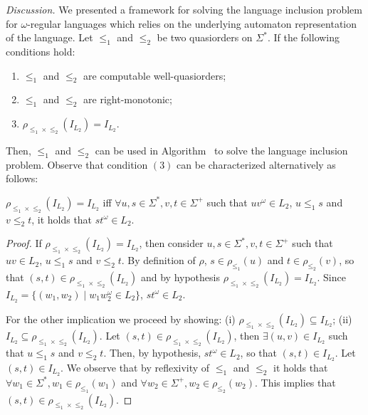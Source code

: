 \emph{Discussion.}
We presented a framework for solving the language inclusion problem for
$\omega$-regular languages which relies on the underlying automaton representation
of the language.
Let $\leq_1$ and $\leq_2$ be two quasiorders on $\Sigma^*$.
If the following conditions hold:
\begin{enumerate}
\item $\leq_1$ and $\leq_2$ are computable well-quasiorders;
\item $\leq_1$ and $\leq_2$ are right-monotonic;
\item $\rho_{\leq_1 \times \leq_2}(I_{L_2}) = I_{L_2}$.
\end{enumerate}
Then, $\leq_1$ and $\leq_2$ can be used in Algorithm~
to solve the language inclusion problem.
Observe that condition $(3)$ can be characterized alternatively as follows:

\begin{proposition}
\label{prop:rho-iff-stomega-in-lang}
$\rho_{\leq_1 \times \leq_2}(I_{L_2}) = I_{L_2}$ iff
$\forall u,s \in \Sigma^*, v,t \in \Sigma^+$
such that $uv ^{\omega} \in L_2$, $u \leq_1 s$ and $v \leq_2 t$,
it holds that $st ^{\omega} \in L_2$.
\end{proposition}

\begin{proof}
If $\rho_{\leq_1 \times \leq_2}(I_{L_2}) = I_{L_2}$, then
consider $u,s \in \Sigma^*, v,t \in \Sigma^+$ such that
$uv \in L_2$, $u \leq_1 s$ and $v \leq_2 t$.
By definition of $\rho$, $s \in \rho_{\leq_1}(u)$ and $t \in \rho_{\leq_2}(v)$,
so that $(s,t) \in \rho_{\leq_1 \times \leq_2}(I_{L_2})$ and by hypothesis
$\rho_{\leq_1 \times \leq_2}(I_{L_2}) = I_{L_2}$.
Since $I_{L_2} = \{ (w_1,w_2) \;|\; w_1w_2^{\omega} \in L_2\}$,
$st ^{\omega} \in L_2$.

For the other implication we proceed by showing:
(i) $\rho_{\leq_1 \times \leq_2}(I_{L_2}) \subseteq I_{L_2}$;
(ii) $ I_{L_2} \subseteq \rho_{\leq_1 \times \leq_2}(I_{L_2})$.
Let $(s,t) \in \rho_{\leq_1 \times \leq_2}(I_{L_2})$, then
$\exists (u,v) \in I_{L_2}$ such that $u \leq_1 s$ and $v \leq_2 t$.
Then, by hypothesis, $st ^{\omega} \in L_2$, so that $(s,t) \in I_{L_2}$.
Let $(s,t) \in I_{L_2}$.
We observe that by reflexivity of $\leq_1$ and $\leq_2$
it holds that $\forall w_1 \in \Sigma^*, w_1 \in \rho_{\leq_1}(w_1)$ and
$\forall w_2 \in \Sigma^+, w_2 \in \rho_{\leq_2}(w_2)$.
This implies that $(s,t) \in \rho_{\leq_1 \times \leq_2}(I_{L_2})$.
\end{proof}

